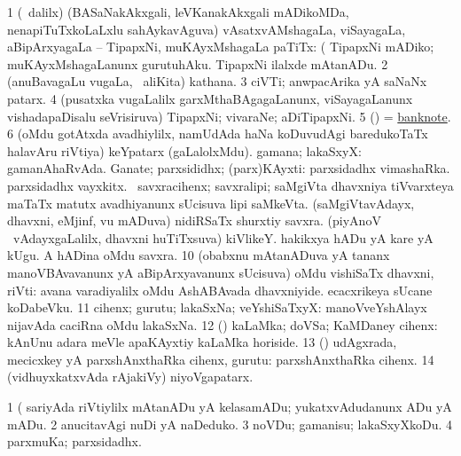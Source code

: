 \bentry
{}
\gl{\nA}
\bmng
\bnum
\num{1} (\sA\ \bava dalilx) (BASaNakAkxgali, leVKanakAkxgali mADikoMDa, nenapiTuTxkoLaLxlu sahAykavAguva) vAsatxvAMshagaLa, viSayagaLa, aBipArxyagaLa -- TipapxNi, muKAyxMshagaLa paTiTx:  (  TipapxNi mADiko; muKAyxMshagaLanunx gurutuhAku.  TipapxNi ilalxde mAtanADu. 
\num{2} (anuBavagaLu \mo vugaLa, \sA\ aliKita) kathana. 
\num{3} ciVTi; anwpacArika yA saNaNx patarx. 
\num{4} (pusatxka \mo vugaLalilx garxMthaBAgagaLanunx, viSayagaLanunx vishadapaDisalu seVrisiruva) TipapxNi; vivaraNe; aDiTipapxNi. 
\num{5} (\birx) = \hyperref{kandict_b.pdf}{B}{banknote}{banknote}. 
\num{6} (oMdu gotAtxda avadhiylilx, namUdAda haNa koDuvudAgi baredukoTaTx halavAru riVtiya) keYpatarx (gaLalolxMdu). 
\banum
{} gamana; lakaSxyX:  gamanAhaRvAda. 
 Ganate; parxsididhx; (parx)KAyxti:  parxsidadhx vimashaRka.  parxsidadhx vayxkitx. 
\eanum
\numie
{} 
\banum
{} \saM\ savxracihenx; savxralipi; saMgiVta dhavxniya tiVvarxteya maTaTx matutx avadhiyanunx sUcisuva lipi saMkeVta. 
 (saMgiVtavAdayx, dhavxni, eMjinf, \mo vu mADuva) nidiRSaTx shurxtiy savxra. 
 (piyAnoV \mo\ vAdayxgaLalilx, dhavxni huTiTxsuva) kiVlikeY. 
\eanum
\numie
{} 
\banum
{} hakikxya hADu yA kare yA kUgu. 
 A hADina oMdu savxra. 
\eanum
\numie
\num{10} (obabxnu mAtanADuva yA tananx manoVBAvavanunx yA aBipArxyavanunx sUcisuva) oMdu vishiSaTx dhavxni, riVti:  avana varadiyalilx oMdu AshABAvada dhavxniyide.  ecacxrikeya sUcane koDabeVku. 
\num{11} cihenx; gurutu; lakaSxNa; veYshiSaTxyX:  manoVveYshAlayx nijavAda caciRna oMdu lakaSxNa. 
\num{12} (\pArxparx) kaLaMka; doVSa; KaMDaney cihenx:  kAnUnu adara meVle apaKAyxtiy kaLaMka horiside. 
\num{13} (\pArxparx) udAgxrada, mecicxkey yA parxshAnxthaRka cihenx, gurutu:  parxshAnxthaRka cihenx. 
\num{14} (vidhuyxkatxvAda rAjakiVy) niyoVgapatarx. 
\enum
\emng

\noindent
\gl{\pagu}
\bmng
{} 
\bnum
\num{1}  (  sariyAda riVtiylilx mAtanADu yA kelasamADu; yukatxvAdudanunx ADu yA mADu. 
\num{2}  anucitavAgi nuDi yA naDeduko. 
\num{3}  noVDu; gamanisu; lakaSxyXkoDu. 
\num{4}  parxmuKa; parxsidadhx. 
\enum
\emng
\eentry

